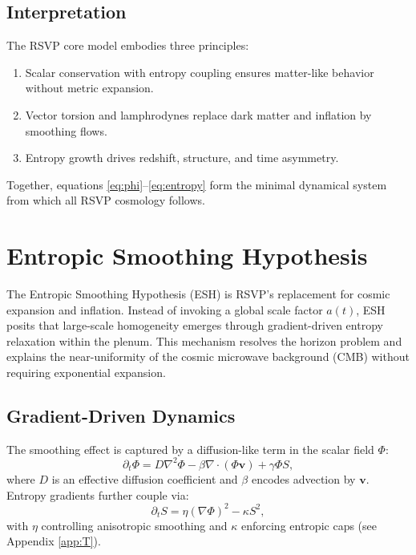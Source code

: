 \documentclass[12pt]{report}
\begin{document}
\section{Interpretation}
The RSVP core model embodies three principles:
\begin{enumerate}
    \item Scalar conservation with entropy coupling ensures matter-like behavior without metric expansion.
    \item Vector torsion and lamphrodynes replace dark matter and inflation by smoothing flows.
    \item Entropy growth drives redshift, structure, and time asymmetry.
\end{enumerate}
Together, equations \eqref{eq:phi}--\eqref{eq:entropy} form the minimal dynamical system from which all RSVP cosmology follows.

\chapter{Entropic Smoothing Hypothesis}
\label{chap:entropic-smoothing}
The Entropic Smoothing Hypothesis (ESH) is RSVP’s replacement for cosmic expansion and inflation. Instead of invoking a global scale factor \(a(t)\), ESH posits that large-scale homogeneity emerges through gradient-driven entropy relaxation within the plenum. This mechanism resolves the horizon problem and explains the near-uniformity of the cosmic microwave background (CMB) without requiring exponential expansion.

\section{Gradient-Driven Dynamics}
The smoothing effect is captured by a diffusion-like term in the scalar field \(\Phi\):
\begin{equation}
\partial_t \Phi = D \nabla^2 \Phi - \beta \nabla \cdot (\Phi \mathbf{v}) + \gamma \Phi S, \label{eq:grad-smoothing}
\end{equation}
where \(D\) is an effective diffusion coefficient and \(\beta\) encodes advection by \(\mathbf{v}\). Entropy gradients further couple via:
\begin{equation}
\partial_t S = \eta (\nabla \Phi)^2 - \kappa S^2, \label{eq:entropy-smoothing}
\end{equation}
with \(\eta\) controlling anisotropic smoothing and \(\kappa\) enforcing entropic caps (see Appendix \ref{app:T}).
\end{document}
